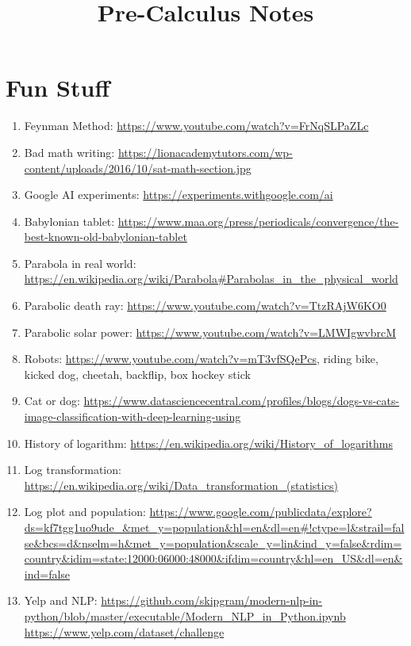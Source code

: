 \documentclass{article}
\title{Pre-Calculus Notes}
\date
\begin{document}
\maketitle
\large

\tableofcontents


\section{Fun Stuff}

\begin{enumerate}
\item Feynman Method: \url{https://www.youtube.com/watch?v=FrNqSLPaZLc}
\item Bad math writing: \url{https://lionacademytutors.com/wp-content/uploads/2016/10/sat-math-section.jpg}
\item Google AI experiments: \url{https://experiments.withgoogle.com/ai}
\item Babylonian tablet: \url{https://www.maa.org/press/periodicals/convergence/the-best-known-old-babylonian-tablet}
\item Parabola in real world: \url{https://en.wikipedia.org/wiki/Parabola#Parabolas_in_the_physical_world}
\item Parabolic death ray: \url{https://www.youtube.com/watch?v=TtzRAjW6KO0}
\item Parabolic solar power: \url{https://www.youtube.com/watch?v=LMWIgwvbrcM}
\item Robots: \url{https://www.youtube.com/watch?v=mT3vfSQePcs}, riding bike, kicked dog, cheetah, backflip, box hockey stick
\item Cat or dog: \url{https://www.datasciencecentral.com/profiles/blogs/dogs-vs-cats-image-classification-with-deep-learning-using}
\item History of logarithm: \url{https://en.wikipedia.org/wiki/History_of_logarithms}
\item Log transformation: \url{https://en.wikipedia.org/wiki/Data_transformation_(statistics)}
\item Log plot and population: \url{https://www.google.com/publicdata/explore?ds=kf7tgg1uo9ude_&met_y=population&hl=en&dl=en#!ctype=l&strail=false&bcs=d&nselm=h&met_y=population&scale_y=lin&ind_y=false&rdim=country&idim=state:12000:06000:48000&ifdim=country&hl=en_US&dl=en&ind=false} 
\item Yelp and NLP: \url{https://github.com/skipgram/modern-nlp-in-python/blob/master/executable/Modern_NLP_in_Python.ipynb} \url{https://www.yelp.com/dataset/challenge}

\end{enumerate}
\end{document}
